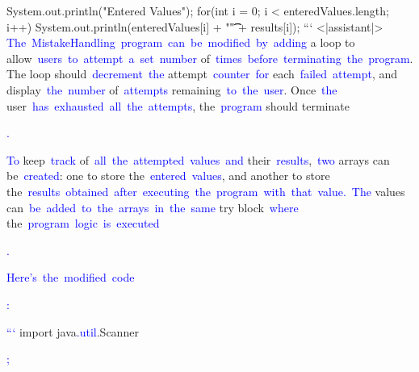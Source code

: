 \documentclass{article}
\begin{document}
\begin{tcolorbox}[colframe=black,colback=white]
{{        System.out.println("Entered Values\tResult");
        for(int i = 0; i < enteredValues.length; i++) {
            System.out.println(enteredValues[i] + "\t\t" + results[i]);
        }
    }
}
```
<|assistant|>
\textcolor{blue}{The}\textcolor{blue}{~Mist}\textcolor{blue}{ake}\textcolor{blue}{Handling}\textcolor{blue}{~program}\textcolor{blue}{~can}\textcolor{blue}{~be}\textcolor{blue}{~modified}\textcolor{blue}{~by}\textcolor{blue}{~adding} a loop to allow\textcolor{blue}{~users}\textcolor{blue}{~to}\textcolor{blue}{~attempt}\textcolor{blue}{~a}\textcolor{blue}{~set}\textcolor{blue}{~number} of\textcolor{blue}{~times}\textcolor{blue}{~before}\textcolor{blue}{~terminating}\textcolor{blue}{~the}\textcolor{blue}{~program}. The loop should\textcolor{blue}{~decrement}\textcolor{blue}{~the} attempt\textcolor{blue}{~counter}\textcolor{blue}{~for} each\textcolor{blue}{~failed}\textcolor{blue}{~attempt}, and display\textcolor{blue}{~the}\textcolor{blue}{~number} of\textcolor{blue}{~attempts} remaining\textcolor{blue}{~to}\textcolor{blue}{~the}\textcolor{blue}{~user}. Once\textcolor{blue}{~the} user\textcolor{blue}{~has}\textcolor{blue}{~exhausted}\textcolor{blue}{~all}\textcolor{blue}{~the}\textcolor{blue}{~attempts}, the\textcolor{blue}{~program} should terminate\textcolor{blue}{.

}\textcolor{blue}{To} keep\textcolor{blue}{~track} of\textcolor{blue}{~all}\textcolor{blue}{~the}\textcolor{blue}{~attempted}\textcolor{blue}{~values}\textcolor{blue}{~and} their\textcolor{blue}{~results},\textcolor{blue}{~two} arrays can be\textcolor{blue}{~created}: one to store the\textcolor{blue}{~entered}\textcolor{blue}{~values}, and another to store the\textcolor{blue}{~results}\textcolor{blue}{~obtained}\textcolor{blue}{~after}\textcolor{blue}{~executing}\textcolor{blue}{~the}\textcolor{blue}{~program}\textcolor{blue}{~with}\textcolor{blue}{~that}\textcolor{blue}{~value}\textcolor{blue}{.}\textcolor{blue}{~The} values can\textcolor{blue}{~be}\textcolor{blue}{~added}\textcolor{blue}{~to}\textcolor{blue}{~the}\textcolor{blue}{~arrays}\textcolor{blue}{~in}\textcolor{blue}{~the}\textcolor{blue}{~same} try block\textcolor{blue}{~where} the\textcolor{blue}{~program}\textcolor{blue}{~logic}\textcolor{blue}{~is}\textcolor{blue}{~executed}\textcolor{blue}{.

}\textcolor{blue}{Here}\textcolor{blue}{'s}\textcolor{blue}{~the}\textcolor{blue}{~modified}\textcolor{blue}{~code}\textcolor{blue}{:

}\textcolor{blue}{```}\textcolor{blue}{
}import java\textcolor{blue}{.util}.Scanner\textcolor{blue}{;

}
\end{tcolorbox}
\end{document}
